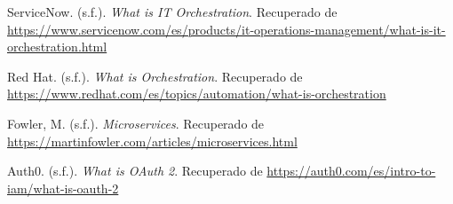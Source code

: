 \documentclass[12pt]{article}
\begin{document}
\begin{thebibliography}{9}

ServiceNow. (s.f.). \textit{What is IT Orchestration}. Recuperado de \url{https://www.servicenow.com/es/products/it-operations-management/what-is-it-orchestration.html}

Red Hat. (s.f.). \textit{What is Orchestration}. Recuperado de \url{https://www.redhat.com/es/topics/automation/what-is-orchestration}

Fowler, M. (s.f.). \textit{Microservices}. Recuperado de \url{https://martinfowler.com/articles/microservices.html}

Auth0. (s.f.). \textit{What is OAuth 2}. Recuperado de \url{https://auth0.com/es/intro-to-iam/what-is-oauth-2}

\end{thebibliography}
\end{document}

